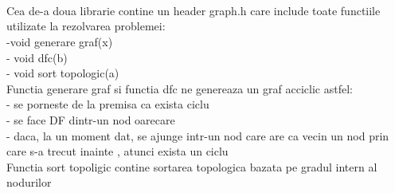 \documentclass[14pt]{article}
\begin{document}
\\\vspace{5 mm}
\\
\\Cea de-a doua librarie contine un header graph.h care include toate functiile utilizate la rezolvarea problemei:
\\ -void  generare graf(x)
\\- void  dfc(b)
\\- void  sort topologic(a)
\\Functia generare graf si functia dfc ne genereaza un graf acciclic astfel:
\\- se porneste de la premisa ca exista ciclu
\\- se face DF dintr-un nod oarecare
\\- daca, la un moment dat, se ajunge intr-un nod care are ca vecin un nod prin care s-a trecut inainte , atunci exista un ciclu
\\Functia sort topoligic  contine sortarea topologica bazata pe gradul intern al
nodurilor
\end{document}

